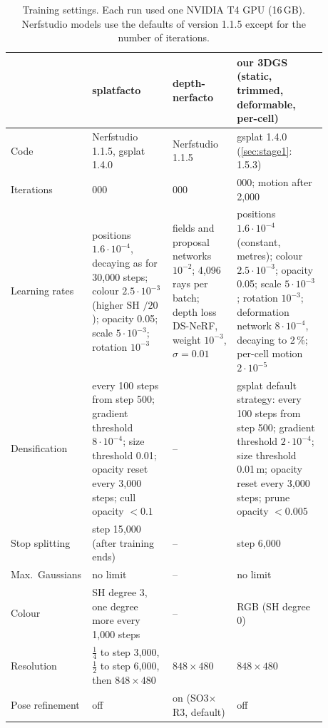 \documentclass[preprint,11pt,authoryear]{elsarticle}
\begin{document}
\begin{table}[!tbp]
\centering\footnotesize
\caption{Training settings. Each run used one NVIDIA T4 GPU (16\,GB). Nerfstudio models use the defaults of version 1.1.5 except for the number of iterations.}
\label{tab:training}
\begin{tabular}{@{}>{\raggedright\arraybackslash}p{0.15\linewidth}>{\raggedright\arraybackslash}p{0.25\linewidth}>{\raggedright\arraybackslash}p{0.2\linewidth}>{\raggedright\arraybackslash}p{0.28\linewidth}@{}}
\toprule
 & splatfacto & depth-nerfacto & our 3DGS (static, trimmed, deformable, per-cell) \\
\midrule
Code & Nerfstudio 1.1.5, gsplat 1.4.0 & Nerfstudio 1.1.5 & gsplat 1.4.0 (\cref{sec:stage1}: 1.5.3) \\
Iterations & 7{,}000 & 15{,}000 & 10{,}000; motion after 2{,}000 \\
Learning rates & positions $1.6\cdot10^{-4}$, decaying as for 30{,}000 steps; colour $2.5\cdot10^{-3}$ (higher SH $/20$); opacity 0.05; scale $5\cdot10^{-3}$; rotation $10^{-3}$ & fields and proposal networks $10^{-2}$; 4{,}096 rays per batch; depth loss DS-NeRF, weight $10^{-3}$, $\sigma = 0.01$ & positions $1.6\cdot10^{-4}$ (constant, metres); colour $2.5\cdot10^{-3}$; opacity 0.05; scale $5\cdot10^{-3}$; rotation $10^{-3}$; deformation network $8\cdot10^{-4}$, decaying to 2\,\%; per-cell motion $2\cdot10^{-5}$ \\
Densification & every 100 steps from step 500; gradient threshold $8\cdot10^{-4}$; size threshold 0.01; opacity reset every 3{,}000 steps; cull opacity $<0.1$ & -- & gsplat default strategy: every 100 steps from step 500; gradient threshold $2\cdot10^{-4}$; size threshold 0.01\,m; opacity reset every 3{,}000 steps; prune opacity $<0.005$ \\
Stop splitting & step 15{,}000 (after training ends) & -- & step 6{,}000 \\
Max.\ Gaussians & no limit & -- & no limit \\
Colour & SH degree 3, one degree more every 1{,}000 steps & -- & RGB (SH degree 0) \\
Resolution & $\tfrac14$ to step 3{,}000, $\tfrac12$ to step 6{,}000, then $848\times480$ & $848\times480$ & $848\times480$ \\
Pose refinement & off & on (SO3$\times$R3, default) & off \\
\bottomrule
\end{tabular}
\end{table}
\end{document}
